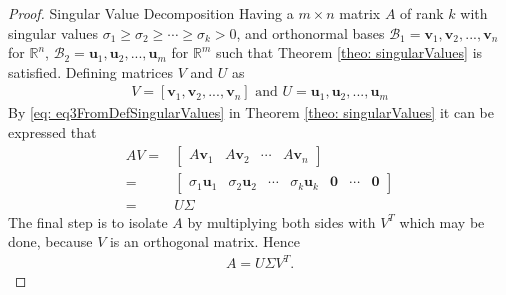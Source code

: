 \begin{proof}{Singular Value Decomposition}
    Having a $m \times n$ matrix $A$ of rank $k$ with singular values $\sigma_1 \geq \sigma_2 \geq \cdots \geq \sigma_k > 0$, and orthonormal bases $\mathcal{B}_1={\mathbf{v}_1, \mathbf{v}_2,..., \mathbf{v}_n}$ for $\mathbb{R}^n$, $\mathcal{B}_2={\mathbf{u}_1, \mathbf{u}_2,..., \mathbf{u}_m}$ for $\mathbb{R}^m$ such that Theorem \ref{theo: singularValues} is satisfied. Defining matrices $V$ and $U$ as 
    \begin{align}
        V = [\mathbf{v}_1, \mathbf{v}_2,..., \mathbf{v}_n] \text{ and } U = \mathbf{u}_1, \mathbf{u}_2,..., \mathbf{u}_m
    \end{align}
    By \eqref{eq: eq3FromDefSingularValues} in Theorem \ref{theo: singularValues} it can be expressed that
    \begin{align*}
        AV=& \begin{bmatrix}
        A\mathbf{v}_1 & A\mathbf{v}_2 & \cdots & A\mathbf{v}_n
        \end{bmatrix}\\
        =& \begin{bmatrix}
        \sigma_1\mathbf{u}_1 & \sigma_2\mathbf{u}_2 & \cdots & \sigma_k\mathbf{u}_k & \mathbf{0} & \cdots & \mathbf{0}
        \end{bmatrix}\\
        =&U\Sigma 
    \end{align*}
    The final step is to isolate $A$ by multiplying both sides with $V^T$  which may be done, because $V$ is an orthogonal matrix. Hence
    \begin{align*}
        A=U\Sigma V^T.
    \end{align*}\qedsymbol
\end{proof}

